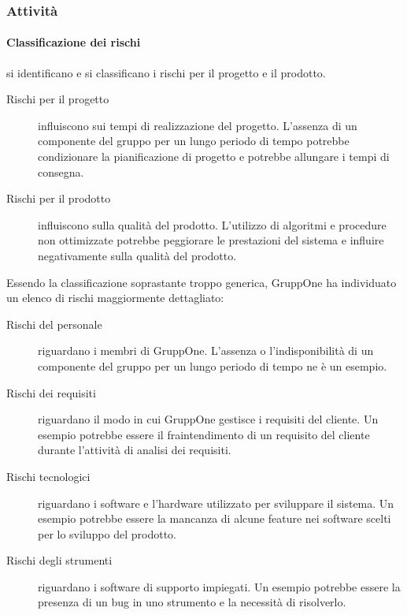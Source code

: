 \documentclass[../../norme-di-progetto.tex]{subfiles}
\begin{document}
\subsubsection{Attività}%
\label{subs:gestione_dei_rischi/attivita}

\paragraph{Classificazione dei rischi}%
\label{par:classificazione_dei_rischi}

si identificano e si classificano i rischi per il progetto e il prodotto.

\begin{description}
  \item [Rischi per il progetto] influiscono sui tempi di realizzazione del progetto.
        L'assenza di un componente del gruppo per un lungo periodo di tempo potrebbe condizionare la pianificazione di progetto e potrebbe allungare i tempi di consegna.
  \item [Rischi per il prodotto] influiscono sulla qualità del prodotto.
        L'utilizzo di algoritmi e procedure non ottimizzate potrebbe peggiorare le prestazioni del sistema e influire negativamente sulla qualità del prodotto.
\end{description}

Essendo la classificazione soprastante troppo generica, GruppOne ha individuato un elenco di rischi maggiormente dettagliato:
\begin{description}
  \item [Rischi del personale] riguardano i membri di GruppOne.
        L'assenza o l'indisponibilità di un componente del gruppo per un lungo periodo di tempo ne è un esempio.
  \item [Rischi dei requisiti] riguardano il modo in cui GruppOne gestisce i requisiti del cliente.
        Un esempio potrebbe essere il fraintendimento di un requisito del cliente durante l'attività di analisi dei requisiti.
  \item [Rischi tecnologici] riguardano i software e l'hardware utilizzato per sviluppare il sistema.
        Un esempio potrebbe essere la mancanza di alcune feature nei software scelti per lo sviluppo del prodotto.
  \item [Rischi degli strumenti] riguardano i software di supporto impiegati.
        Un esempio potrebbe essere la presenza di un bug in uno strumento e la necessità di risolverlo.
\end{description}
\end{document}
